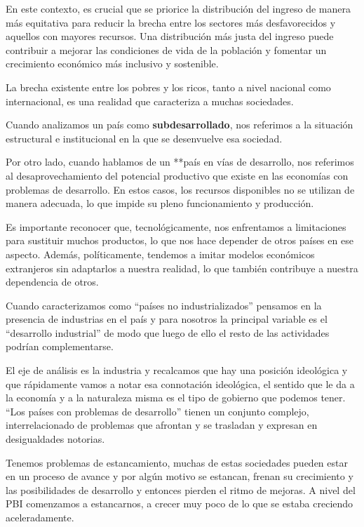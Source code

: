 \documentclass[
  a4paper,
]{article}
\begin{document}
En este contexto, es crucial que se priorice la distribución del ingreso
de manera más equitativa para reducir la brecha entre los sectores más
desfavorecidos y aquellos con mayores recursos. Una distribución más
justa del ingreso puede contribuir a mejorar las condiciones de vida de
la población y fomentar un crecimiento económico más inclusivo y
sostenible.

La brecha existente entre los pobres y los ricos, tanto a nivel nacional
como internacional, es una realidad que caracteriza a muchas sociedades.

Cuando analizamos un país como \textbf{subdesarrollado}, nos referimos a
la situación estructural e institucional en la que se desenvuelve esa
sociedad.

Por otro lado, cuando hablamos de un **país en vías de desarrollo, nos
referimos al desaprovechamiento del potencial productivo que existe en
las economías con problemas de desarrollo. En estos casos, los recursos
disponibles no se utilizan de manera adecuada, lo que impide su pleno
funcionamiento y producción.

Es importante reconocer que, tecnológicamente, nos enfrentamos a
limitaciones para sustituir muchos productos, lo que nos hace depender
de otros países en ese aspecto. Además, políticamente, tendemos a imitar
modelos económicos extranjeros sin adaptarlos a nuestra realidad, lo que
también contribuye a nuestra dependencia de otros.

Cuando caracterizamos como ``países no industrializados'' pensamos en la
presencia de industrias en el país y para nosotros la principal variable
es el ``desarrollo industrial'' de modo que luego de ello el resto de
las actividades podrían complementarse.

El eje de análisis es la industria y recalcamos que hay una posición
ideológica y que rápidamente vamos a notar esa connotación ideológica,
el sentido que le da a la economía y a la naturaleza misma es el tipo de
gobierno que podemos tener. ``Los países con problemas de desarrollo''
tienen un conjunto complejo, interrelacionado de problemas que afrontan
y se trasladan y expresan en desigualdades notorias.

Tenemos problemas de estancamiento, muchas de estas sociedades pueden
estar en un proceso de avance y por algún motivo se estancan, frenan su
crecimiento y las posibilidades de desarrollo y entonces pierden el
ritmo de mejoras. A nivel del PBI comenzamos a estancarnos, a crecer muy
poco de lo que se estaba creciendo aceleradamente.
\end{document}
